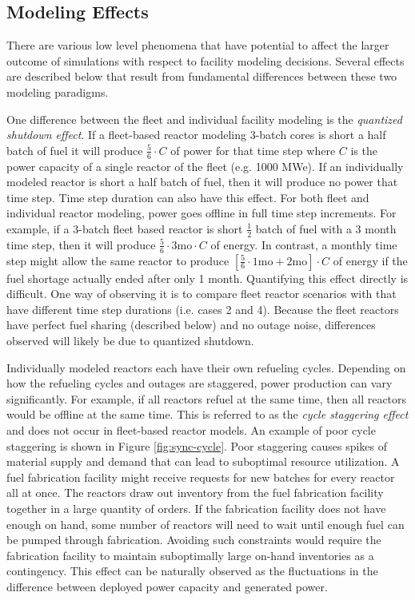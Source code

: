 \documentclass{style}
\begin{document}
\subsection{Modeling Effects}

There are various low level phenomena that have potential to affect the larger
outcome of simulations with respect to facility modeling decisions. Several
effects are described below that result from fundamental differences between
these two modeling paradigms.

One difference between the fleet and individual facility modeling is the
\emph{quantized shutdown effect}.  If a fleet-based reactor modeling 3-batch
cores is short a half batch of fuel it will produce $\frac{5}{6}\cdot C$ of
power for that time step where $C$ is the power capacity of a single reactor
of the fleet (e.g. 1000 MWe).  If an individually modeled reactor is short a
half batch of fuel, then it will produce no power that time step.  Time step
duration can also have this effect.  For both fleet and individual reactor
modeling, power goes offline in full time step increments.  For example, if a
3-batch fleet based reactor is short $\frac{1}{2}$ batch of fuel with a 3
month time step, then it will produce $\frac{5}{6} \cdot 3 \text{mo} \cdot C $
of energy.  In contrast, a monthly time step might allow the same reactor to
produce $[\frac{5}{6} \cdot 1 \text{mo} + 2 \text{mo}] \cdot C $ of energy if
the fuel shortage actually ended after only 1 month.  Quantifying this effect
directly is difficult.  One way of observing it is to compare fleet reactor
scenarios with that have different time step durations (i.e. cases 2 and 4).
Because the fleet reactors have perfect fuel sharing (described below) and no
outage noise, differences observed will likely be due to quantized shutdown.

Individually modeled reactors each have their own refueling cycles.  Depending
on how the refueling cycles and outages are staggered, power production can
vary significantly.  For example, if all reactors refuel at the same time,
then all reactors would be offline at the same time.  This is referred to as
the \emph{cycle staggering effect} and does not occur in fleet-based reactor
models.  An example of poor cycle staggering is shown in Figure
\ref{fig:sync-cycle}.  Poor staggering causes spikes of material supply and
demand that can lead to suboptimal resource utilization.  A fuel fabrication
facility might receive requests for new batches for every reactor all at once.
The reactors draw out inventory from the fuel fabrication facility together in
a large quantity of orders.  If the fabrication facility does not have enough
on hand, some number of reactors will need to wait until enough fuel can be
pumped through fabrication.  Avoiding such constraints would require the
fabrication facility to maintain suboptimally large on-hand inventories as a
contingency.  This effect can be naturally observed as the fluctuations in the
difference between deployed power capacity and generated power.
\end{document}
